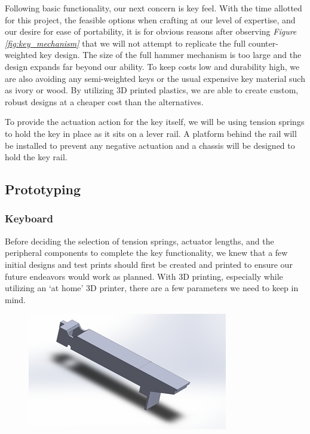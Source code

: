 Following basic functionality, our next concern is key feel. With the time allotted for this project, the feasible options when crafting at our level of expertise, and our desire for ease of portability, it is for obvious reasons after observing \textit{Figure \ref{fig:key_mechanism}} that we will not attempt to replicate the full counter-weighted key design. The size of the full hammer mechanism is too large and the design expands far beyond our ability. To keep costs low and durability high, we are also avoiding any semi-weighted keys or the usual expensive key material such as ivory or wood. By utilizing 3D printed plastics, we are able to create custom, robust designs at a cheaper cost than the alternatives.

To provide the actuation action for the key itself, we will be using tension springs to hold the key in place as it sits on a lever rail. A platform behind the rail will be installed to prevent any negative actuation and a chassis will be designed to hold the key rail.

\subsection{Prototyping}

\subsubsection{Keyboard}

Before deciding the selection of tension springs, actuator lengths, and the peripheral components to complete the key functionality, we knew that a few initial designs and test prints should first be created and printed to ensure our future endeavors would work as planned. With 3D printing, especially while utilizing an ‘at home’ 3D printer, there are a few parameters we need to keep in mind.

\begin{figure}[h!]
  \centering
  \includegraphics[width=0.7\linewidth]{image/WhiteModel1.png}
  \caption{}
  \label{fig:white_model1}
\end{figure}

